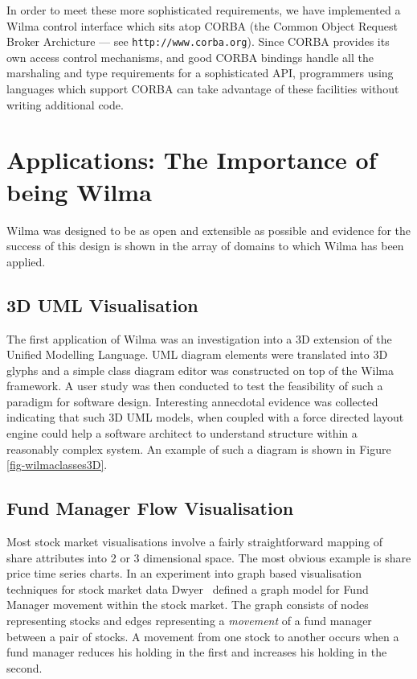 \documentclass[runningheads]{cl2emult}
\newcommand{\url}[1]{{\small{\tt #1}}}
\begin{document}
In order to meet these more sophisticated requirements, we have implemented a
Wilma control interface which sits atop CORBA (the Common Object Request
Broker Archicture --- see \url{http://www.corba.org}).  Since CORBA provides
its own access control mechanisms, and good CORBA bindings handle all the
marshaling and type requirements for a sophisticated API, programmers using
languages which support CORBA can take advantage of these facilities without
writing additional code.

\section{Applications: The Importance of being Wilma}
\label{sec:results}
Wilma was designed to be as open and extensible as possible and
evidence for the success of this design is shown in the array of
domains to which Wilma has been applied.

\subsection{3D UML Visualisation} \label{sec:3duml}
The first application of Wilma was an investigation into a 3D
extension of the Unified Modelling Language\cite{dwyer013D-UML}.
UML diagram elements were translated into 3D glyphs and a simple class
diagram editor was constructed on top of the Wilma framework.  A user study
was then conducted to test the feasibility of such a paradigm for
software design.  Interesting annecdotal evidence was collected
indicating that such 3D UML models, when coupled with a force directed
layout engine could help a software architect to understand structure
within a reasonably complex system.  An example of such a diagram is
shown in Figure \ref{fig-wilmaclasses3D}.

\subsection{Fund Manager Flow Visualisation} \label{sec:fmflow}
Most stock market visualisations involve a fairly straightforward
mapping of share attributes into 2 or 3 dimensional space.  The most
obvious example is share price time series charts.  In an experiment
into graph based visualisation techniques for stock market data
Dwyer~\cite{dwyer02fmflow} defined a graph model for Fund Manager
movement within the stock market.  The graph consists of nodes
representing stocks and edges representing a {\em movement} of a
fund manager between a pair of stocks.  A movement from one stock to
another occurs when a fund manager reduces his holding in the first
and increases his holding in the second.
\end{document}
